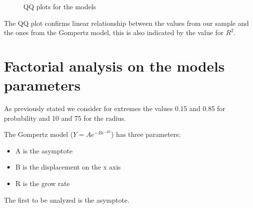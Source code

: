 \begin{figure}[H]
    \centering
    \qquad
    \caption{QQ plots for the models}
\end{figure}




The QQ plot confirms linear relationship between the values from our sample and the ones from the Gompertz model, this is also indicated by the value for $R^2$.

\section{Factorial analysis on the models parameters}
As previously stated we consider for extremes the values 0.15 and 0.85 for probability and 10 and 75 for the radius.

The Gompertz model ($ Y = Ae^{-Be^{-Rt}} $) has three parameters:
\begin{itemize}
	\item A is the asymptote
	\item B is the displacement on the x axis
	\item R is the grow rate
\end{itemize}
The first to be analyzed is the asymptote.

